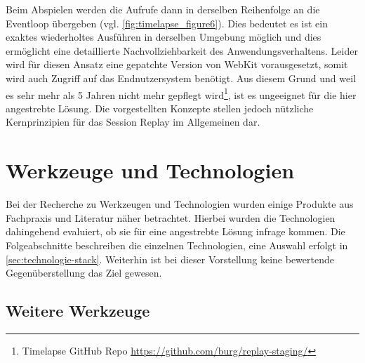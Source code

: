 Beim Abspielen werden die Aufrufe dann in derselben Reihenfolge an die Eventloop übergeben (vgl. \autoref{fig:timelapse_figure6}). Dies bedeutet es ist ein exaktes wiederholtes Ausführen in derselben Umgebung möglich und dies ermöglicht eine detaillierte Nachvollziehbarkeit des Anwendungsverhaltens. Leider wird für diesen Ansatz eine gepatchte Version von WebKit vorausgesetzt, somit wird auch Zugriff auf das Endnutzersystem benötigt. Aus diesem Grund und weil es sehr mehr als 5 Jahren nicht mehr gepflegt wird\footnote{Timelapse GitHub Repo \url{https://github.com/burg/replay-staging/}}, ist es ungeeignet für die hier angestrebte Lösung. Die vorgestellten Konzepte stellen jedoch nützliche Kernprinzipien für das Session Replay im Allgemeinen dar.

\section{Werkzeuge und Technologien}
\label{sec:werkzeuge-und-technologien}

%
%


Bei der Recherche zu Werkzeugen und Technologien wurden einige Produkte aus Fachpraxis und Literatur näher betrachtet. Hierbei wurden die Technologien dahingehend evaluiert, ob sie für eine angestrebte Lösung infrage kommen. Die Folgeabschnitte beschreiben die einzelnen Technologien, eine Auswahl erfolgt in \autoref{sec:technologie-stack}. Weiterhin ist bei dieser Vorstellung keine bewertende Gegenüberstellung das Ziel gewesen.

\subsection{Weitere Werkzeuge}
\label{sec:weitere-werkzeuge}

